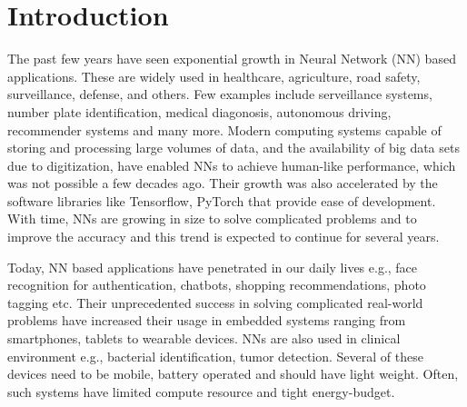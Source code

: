 \graphicspath{{./Ch1-Introduction/images/}}

\chapter{Introduction} \label{chap:introduction}
\begin{comment}
//clearly come out what are you doing in this thesis and what are the contributions
//what field you are targetting, scope and motivation, what problems, to justify your contributions.
1. About AI/ML/NN/DNNs: Applications, Domains, Growth, Type of NNs, Training and inference, 

2. Modern DNNs, architectures and popular NNs

3. Example: Number of computations, parameters: Illustrate compute and memory intensive operations.
Number of layer

4. Edge vs. Cloud Computing. 

5. Edge AI Challenges

6. About the Architectures for Edge AI Accelerators: Give wider scope of these architectures, and specific type of architectures. Trade-offs.

7. Performance bottlenecks for edge AI: Memory and Throughput bottlenecks.
Memory accesses are the key botllenecks for these edge AI devices. 

6. Summary and Outline of the Thesis.

\end{comment}

The past few years have seen exponential growth in Neural Network (NN) based applications. These are widely used in healthcare, agriculture, road safety, surveillance, defense, and others. Few examples include serveillance systems, number plate identification, medical diagonosis, autonomous driving, recommender systems and many more. Modern computing systems capable of storing and processing large volumes of data, and the availability of big data sets due to digitization, have enabled NNs to achieve human-like performance, which was not possible a few decades ago. Their growth was also accelerated by the software libraries like Tensorflow, PyTorch that provide ease of development. With time, NNs are growing in size to solve complicated problems and to improve the accuracy and this trend is expected to continue for several years.

Today, NN based applications have penetrated in our daily lives e.g., face recognition for authentication, chatbots, shopping recommendations, photo tagging etc. Their unprecedented success in solving complicated real-world problems have increased their usage in embedded systems ranging from smartphones, tablets to wearable devices. NNs are also used in clinical environment e.g., bacterial identification, tumor detection. Several of these devices need to be mobile, battery operated and should have light weight. Often, such systems have limited compute resource and tight energy-budget. 

